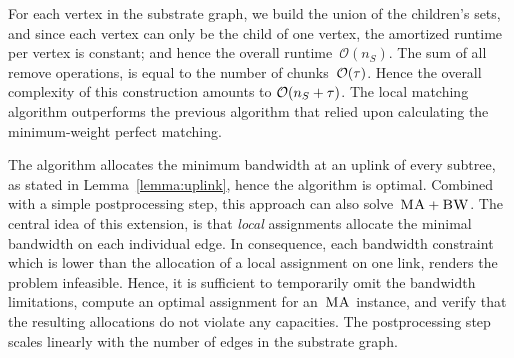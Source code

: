  For each
vertex in the substrate graph,
we build the union of the
children's sets,
and since each vertex can only be the child of one vertex,
the amortized runtime per vertex is constant; and hence the overall
runtime~$\mathcal{O}(n_S)$. The sum of all remove operations, is equal to
the number of chunks~$\mathcal{O}(\tau)$.
Hence the overall complexity of this construction amounts to
$\mathcal{O}(n_S + \tau)$.
The local matching algorithm outperforms the previous algorithm that relied upon calculating the minimum-weight perfect matching.


%

The algorithm allocates the minimum bandwidth at an uplink of every subtree, as stated in Lemma~\ref{lemma:uplink}, hence the algorithm is optimal.
Combined with a simple postprocessing step, this approach can also solve~$\textsc{MA}+\textsc{BW}$. The central idea of this extension, is
that \emph{local} assignments allocate the minimal bandwidth
on each individual edge. In consequence, each bandwidth constraint
which is lower than the allocation of a local assignment on one link, renders
the problem infeasible. Hence, it is sufficient to temporarily omit the
bandwidth limitations, compute an optimal assignment for an~$\textsc{MA}$ instance, and
verify that the resulting allocations do not violate any capacities. The
postprocessing step scales linearly with the number of edges in the substrate
graph.


